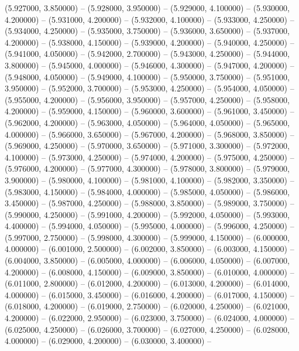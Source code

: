 (5.927000, 3.850000) -- 
(5.928000, 3.950000) -- 
(5.929000, 4.100000) -- 
(5.930000, 4.200000) -- 
(5.931000, 4.200000) -- 
(5.932000, 4.100000) -- 
(5.933000, 4.250000) -- 
(5.934000, 4.250000) -- 
(5.935000, 3.750000) -- 
(5.936000, 3.650000) -- 
(5.937000, 4.200000) -- 
(5.938000, 4.150000) -- 
(5.939000, 4.200000) -- 
(5.940000, 4.250000) -- 
(5.941000, 4.050000) -- 
(5.942000, 2.700000) -- 
(5.943000, 4.250000) -- 
(5.944000, 3.800000) -- 
(5.945000, 4.000000) -- 
(5.946000, 4.300000) -- 
(5.947000, 4.200000) -- 
(5.948000, 4.050000) -- 
(5.949000, 4.100000) -- 
(5.950000, 3.750000) -- 
(5.951000, 3.950000) -- 
(5.952000, 3.700000) -- 
(5.953000, 4.250000) -- 
(5.954000, 4.050000) -- 
(5.955000, 4.200000) -- 
(5.956000, 3.950000) -- 
(5.957000, 4.250000) -- 
(5.958000, 4.200000) -- 
(5.959000, 4.150000) -- 
(5.960000, 3.600000) -- 
(5.961000, 3.450000) -- 
(5.962000, 4.200000) -- 
(5.963000, 4.050000) -- 
(5.964000, 4.050000) -- 
(5.965000, 4.000000) -- 
(5.966000, 3.650000) -- 
(5.967000, 4.200000) -- 
(5.968000, 3.850000) -- 
(5.969000, 4.250000) -- 
(5.970000, 3.650000) -- 
(5.971000, 3.300000) -- 
(5.972000, 4.100000) -- 
(5.973000, 4.250000) -- 
(5.974000, 4.200000) -- 
(5.975000, 4.250000) -- 
(5.976000, 4.200000) -- 
(5.977000, 4.300000) -- 
(5.978000, 3.800000) -- 
(5.979000, 3.900000) -- 
(5.980000, 4.100000) -- 
(5.981000, 4.100000) -- 
(5.982000, 3.350000) -- 
(5.983000, 4.150000) -- 
(5.984000, 4.000000) -- 
(5.985000, 4.050000) -- 
(5.986000, 3.450000) -- 
(5.987000, 4.250000) -- 
(5.988000, 3.850000) -- 
(5.989000, 3.750000) -- 
(5.990000, 4.250000) -- 
(5.991000, 4.200000) -- 
(5.992000, 4.050000) -- 
(5.993000, 4.400000) -- 
(5.994000, 4.050000) -- 
(5.995000, 4.000000) -- 
(5.996000, 4.250000) -- 
(5.997000, 2.750000) -- 
(5.998000, 4.300000) -- 
(5.999000, 4.150000) -- 
(6.000000, 4.000000) -- 
(6.001000, 2.500000) -- 
(6.002000, 3.850000) -- 
(6.003000, 4.150000) -- 
(6.004000, 3.850000) -- 
(6.005000, 4.000000) -- 
(6.006000, 4.050000) -- 
(6.007000, 4.200000) -- 
(6.008000, 4.150000) -- 
(6.009000, 3.850000) -- 
(6.010000, 4.000000) -- 
(6.011000, 2.800000) -- 
(6.012000, 4.200000) -- 
(6.013000, 4.200000) -- 
(6.014000, 4.000000) -- 
(6.015000, 3.450000) -- 
(6.016000, 4.200000) -- 
(6.017000, 4.150000) -- 
(6.018000, 4.200000) -- 
(6.019000, 2.750000) -- 
(6.020000, 4.250000) -- 
(6.021000, 4.200000) -- 
(6.022000, 2.950000) -- 
(6.023000, 3.750000) -- 
(6.024000, 4.000000) -- 
(6.025000, 4.250000) -- 
(6.026000, 3.700000) -- 
(6.027000, 4.250000) -- 
(6.028000, 4.000000) -- 
(6.029000, 4.200000) -- 
(6.030000, 3.400000) -- 
